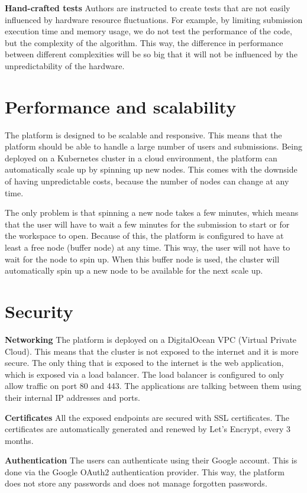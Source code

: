 \documentclass[12pt,a4paper]{report}
\begin{document}
\textbf{Hand-crafted tests}
Authors are instructed to create tests that are not easily influenced by hardware resource fluctuations. For example, by limiting submission execution time and memory usage, we do not test the performance of the code, but the complexity of the algorithm. This way, the difference in performance between different complexities will be so big that it will not be influenced by the unpredictability of the hardware.

\section{Performance and scalability}
The platform is designed to be scalable and responsive. This means that the platform should be able to handle a large number of users and submissions. Being deployed on a Kubernetes cluster in a cloud environment, the platform can automatically scale up by spinning up new nodes. This comes with the downside of having unpredictable costs, because the number of nodes can change at any time.

The only problem is that spinning a new node takes a few minutes, which means that the user will have to wait a few minutes for the submission to start or for the workspace to open. Because of this, the platform is configured to have at least a free node (buffer node) at any time. This way, the user will not have to wait for the node to spin up. When this buffer node is used, the cluster will automatically spin up a new node to be available for the next scale up.

\section{Security}
\textbf{Networking}
The platform is deployed on a DigitalOcean VPC (Virtual Private Cloud). This means that the cluster is not exposed to the internet and it is more secure. The only thing that is exposed to the internet is the web application, which is exposed via a load balancer. The load balancer is configured to only allow traffic on port 80 and 443. The applications are talking between them using their internal IP addresses and ports.

\textbf{Certificates}
All the exposed endpoints are secured with SSL certificates. The certificates are automatically generated and renewed by Let's Encrypt, every 3 months.

\textbf{Authentication}
The users can authenticate using their Google account. This is done via the Google OAuth2 authentication provider. This way, the platform does not store any passwords and does not manage forgotten passwords.
\end{document}
